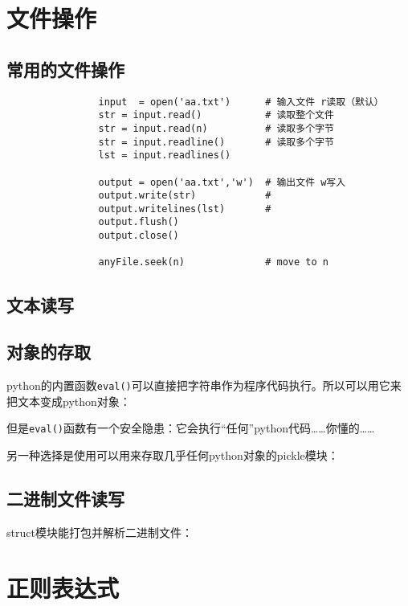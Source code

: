 	\section{文件操作}
		
		\subsection{常用的文件操作}

			\begin{verbatim}
				input  = open('aa.txt')      # 输入文件 r读取（默认）
				str = input.read()           # 读取整个文件
				str = input.read(n)          # 读取多个字节
				str = input.readline()       # 读取多个字节
				lst = input.readlines()

				output = open('aa.txt','w')  # 输出文件 w写入
				output.write(str)            #
				output.writelines(lst)       #
				output.flush()
				output.close()

				anyFile.seek(n)              # move to n
			\end{verbatim}

		\subsection{文本读写}

			


		\subsection{对象的存取}

			python的内置函数\verb|eval()|可以直接把字符串作为程序代码执行。所以可以用它来把文本变成python对象：

			

			但是\verb|eval()|函数有一个安全隐患：它会执行“任何”python代码……你懂的……

			另一种选择是使用可以用来存取几乎任何python对象的pickle模块：

			

		\subsection{二进制文件读写}
			
			struct模块能打包并解析二进制文件：

			

	\section{正则表达式}
		
		
